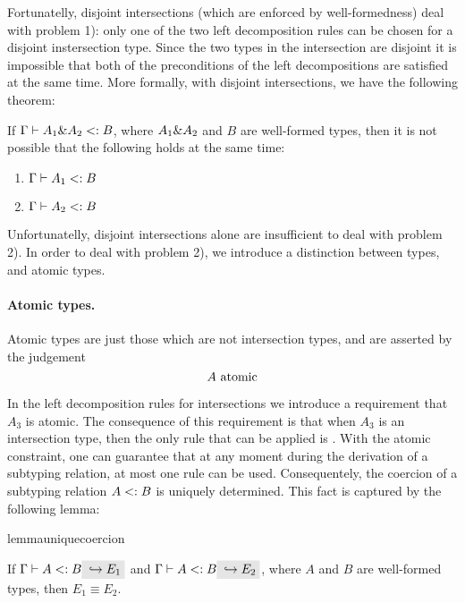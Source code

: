\noindent Fortunatelly, disjoint intersections (which are enforced by well-formedness)
deal with problem 1): only one of the two left decomposition rules
can be chosen for a disjoint instersection type. Since the two types in the intersection
are disjoint it is impossible that both of the preconditions of the left decompositions are satisfied
at the same time. More formally, with disjoint intersections, we have the following theorem:

\begin{lemma}
  \label{lemma:unique-subtype-contributor}

  If $\Gamma \vdash A_1 \& A_2 <: B$, where $A_1 \& A_2$ and $B$ are well-formed types,
  then it is not possible that the following holds at the same time:
  \begin{enumerate}
    \item $\Gamma \vdash A_1 <: B$
    \item $\Gamma \vdash A_2 <: B$
  \end{enumerate}
\end{lemma}

Unfortunatelly, disjoint intersections alone are insufficient to deal with problem 2).
In order to deal with problem 2), we introduce a distinction between types, and atomic types.

\paragraph{Atomic types.} Atomic types are just those which are not intersection
types, and are asserted by the judgement \[ A \ \textnormal{atomic} \]

In the left decomposition rules for intersections we introduce a requirement that
$A_3$ is atomic. The consequence of this requirement is that when $A_3$ is an intersection type, then
the only rule that can be applied is .
With the atomic constraint, one can guarantee that at any moment during the
derivation of a subtyping relation, at most one rule can be used.
Consequentely, the coercion of a subtyping relation $A <: B$ is uniquely determined.
This fact is captured by the following lemma:

\begin{restatable}{lemma}{uniquecoercion}
  \label{lemma:unique-coercion}

  If $\Gamma \vdash A \subtype B \yields {E_1}$ and $\Gamma \vdash A \subtype B \yields {E_2}$, where $A$
  and $B$ are well-formed types, then $E_1 \equiv E_2$.
\end{restatable}

